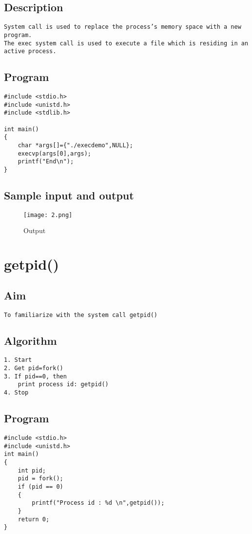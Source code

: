 \documentclass{article}
\begin{document}
\subsection{Description}
\begin{Verbatim}[tabsize = 4]
System call is used to replace the process’s memory space with a new program.
The exec system call is used to execute a file which is residing in an active process.
\end{Verbatim}
\subsection{Program}
\begin{Verbatim}[tabsize = 4]
#include <stdio.h>
#include <unistd.h>
#include <stdlib.h>

int main()
{
	char *args[]={"./execdemo",NULL};
	execvp(args[0],args);
	printf("End\n");
}

\end{Verbatim}
\subsection{Sample input and output}
\begin{figure}[H]
    \centering
    \texttt{[image: 2.png]}
    \caption{Output}
    \label{fig:my_label2}
\end{figure}
\section{\Large getpid()}
\subsection{Aim}
\begin{Verbatim}[tabsize = 4]
To familiarize with the system call getpid()
\end{Verbatim}
\newpage
\subsection{Algorithm}
\begin{Verbatim}[tabsize = 4]
1. Start
2. Get pid=fork()
3. If pid==0, then
    print process id: getpid()
4. Stop
\end{Verbatim}
\subsection{Program}
\begin{Verbatim}[tabsize = 4]
#include <stdio.h>
#include <unistd.h>
int main()
{
	int pid;
	pid = fork();
	if (pid == 0)
	{
		printf("Process id : %d \n",getpid());
	}
	return 0;
}

\end{Verbatim}
\thispagestyle{third}
\end{document}
